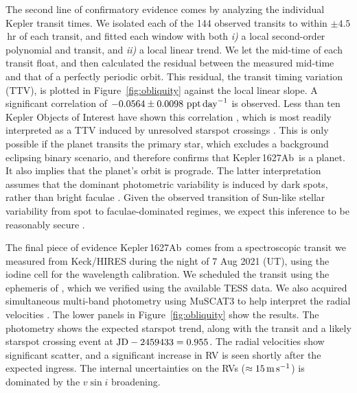 \documentclass[12pt,modern,twocolumn,tighten]{aastex63}
\newcommand{\pn}{Kepler\,1627Ab} %
\begin{document}

The second line of confirmatory evidence comes by analyzing the
individual Kepler transit times. We isolated each of the
144 observed transits to within $\pm4.5$\,hr of each transit, and
fitted each window with both {\it i)} a local second-order polynomial
and transit, and {\it ii)} a local linear trend.  We let the mid-time
of each transit float, and then calculated the residual between the
measured mid-time and that of a perfectly periodic orbit.  This
residual, the transit timing variation (TTV), is plotted in
Figure~\ref{fig:obliquity} against the local linear slope.  A
significant correlation of $-0.0564 \pm 0.0098\ {\rm ppt\,day}^{-1}$
is observed.  Less than ten Kepler Objects of Interest have shown this
correlation \citep{holczer_time_2015}, which is most readily
interpreted as a TTV induced by unresolved starspot crossings
\citep{mazeh_time_2015}.  This is only possible if the planet transits
the primary star, which excludes a background eclipsing binary
scenario, and therefore confirms that \pn\ is a planet.  It also
implies that the planet's orbit is prograde.  The latter
interpretation assumes that the dominant photometric variability is
induced by dark spots, rather than bright faculae
\citep{mazeh_time_2015}.  Given the observed transition of Sun-like
stellar variability from spot to faculae-dominated regimes, we expect
this inference to be reasonably secure
\citep{shapiro_are_2016,montet_long-term_2017,reinhold_stellar_2020}.

The final piece of evidence \pn\ comes from a spectroscopic
transit we measured from Keck/HIRES during the night of 7 Aug 2021
(UT), using the iodine cell for the wavelength calibration.  We
scheduled the transit using the ephemeris of
\citet{holczer_transit_2016}, which we verified using the available
TESS data.  We also acquired simultaneous multi-band photometry using
MuSCAT3 to help interpret the radial velocities \citep{Narita_2020}.
The lower panels in Figure~\ref{fig:obliquity} show the results.  The
photometry shows the expected starspot trend, along with the transit
and a likely starspot crossing event at ${\rm JD} - 2459433 = 0.955$.
The radial velocities show significant scatter, and a significant
increase in RV is seen shortly after the expected ingress.  The
internal uncertainties on the RVs ($\approx 15\,{\rm m\,s}^{-1}$) is
dominated by the $v\sin i$ broadening.
\end{document}
